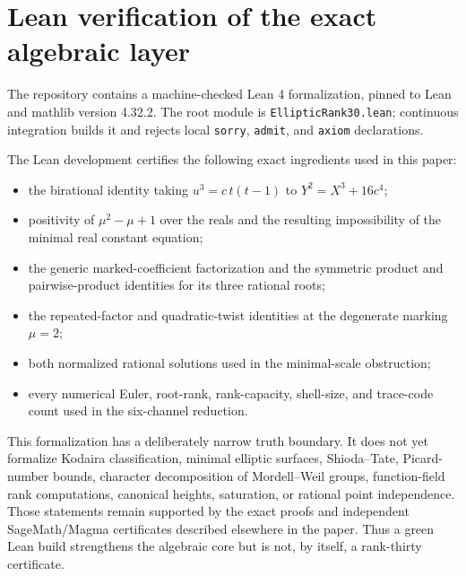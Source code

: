 \section{Lean verification of the exact algebraic layer}

The repository contains a machine-checked Lean 4 formalization, pinned to
Lean and mathlib version 4.32.2.  The root module is
\texttt{EllipticRank30.lean}; continuous integration builds it and rejects
local \texttt{sorry}, \texttt{admit}, and \texttt{axiom} declarations.

The Lean development certifies the following exact ingredients used in this
paper:
\begin{itemize}[leftmargin=*]
\item the birational identity taking
  $u^3=c\,t(t-1)$ to $Y^2=X^3+16c^4$;
\item positivity of $\mu^2-\mu+1$ over the reals and the resulting
  impossibility of the minimal real constant equation;
\item the generic marked-coefficient factorization and the symmetric product
  and pairwise-product identities for its three rational roots;
\item the repeated-factor and quadratic-twist identities at the degenerate
  marking $\mu=2$;
\item both normalized rational solutions used in the minimal-scale
  obstruction;
\item every numerical Euler, root-rank, rank-capacity, shell-size, and
  trace-code count used in the six-channel reduction.
\end{itemize}

This formalization has a deliberately narrow truth boundary.  It does not yet
formalize Kodaira classification, minimal elliptic surfaces, Shioda--Tate,
Picard-number bounds, character decomposition of Mordell--Weil groups,
function-field rank computations, canonical heights, saturation, or rational
point independence.  Those statements remain supported by the exact proofs
and independent SageMath/Magma certificates described elsewhere in the
paper.  Thus a green Lean build strengthens the algebraic core but is not, by
itself, a rank-thirty certificate.
